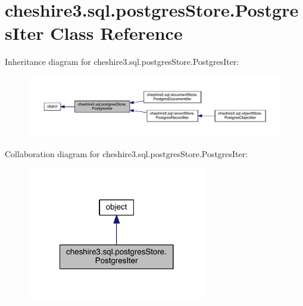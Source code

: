 \hypertarget{classcheshire3_1_1sql_1_1postgres_store_1_1_postgres_iter}{\section{cheshire3.\-sql.\-postgres\-Store.\-Postgres\-Iter Class Reference}
\label{classcheshire3_1_1sql_1_1postgres_store_1_1_postgres_iter}
}


Inheritance diagram for cheshire3.\-sql.\-postgres\-Store.\-Postgres\-Iter\-:
\nopagebreak
\begin{figure}[H]
\begin{center}
\leavevmode
\includegraphics[width=350pt]{classcheshire3_1_1sql_1_1postgres_store_1_1_postgres_iter__inherit__graph}
\end{center}
\end{figure}


Collaboration diagram for cheshire3.\-sql.\-postgres\-Store.\-Postgres\-Iter\-:
\nopagebreak
\begin{figure}[H]
\begin{center}
\leavevmode
\includegraphics[width=222pt]{classcheshire3_1_1sql_1_1postgres_store_1_1_postgres_iter__coll__graph}
\end{center}
\end{figure}
